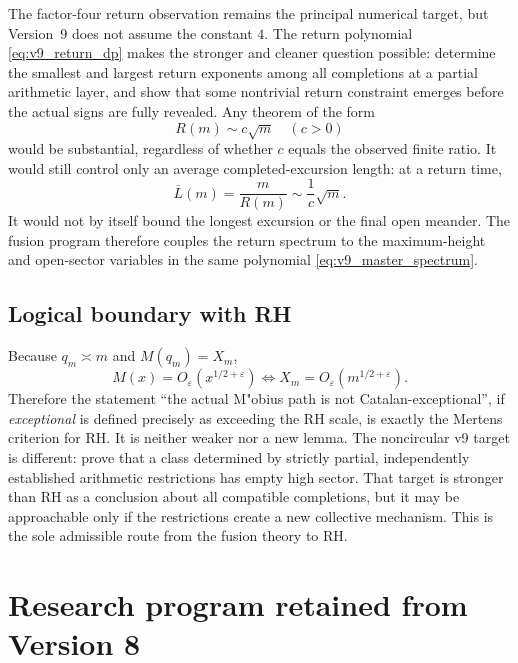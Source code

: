 \documentclass[11pt]{amsart}
\numberwithin{equation}{section}
\theoremstyle{plain}
\theoremstyle{definition}
\theoremstyle{remark}
\newcommand{\eps}{\varepsilon}
\begin{document}
The factor-four return observation remains the principal numerical target,
but Version~9 does not assume the constant $4$.  The return polynomial
\eqref{eq:v9_return_dp} makes the stronger and cleaner question possible:
determine the smallest and largest return exponents among all completions at a
partial arithmetic layer, and show that some nontrivial return constraint
emerges before the actual signs are fully revealed.  Any theorem of the form
\begin{equation}
R(m)\sim c\sqrt m\quad(c>0)
\label{eq:v9_generic_return_law}
\end{equation}
would be substantial, regardless of whether $c$ equals the observed finite
ratio.  It would still control only an average completed-excursion length:
at a return time,
\begin{equation}
\overline L(m)=\frac{m}{R(m)}\sim\frac{1}{c}\sqrt m.
\label{eq:v9_mean_length_generic}
\end{equation}
It would not by itself bound the longest excursion or the final open meander.
The fusion program therefore couples the return spectrum to the maximum-height
and open-sector variables in the same polynomial \eqref{eq:v9_master_spectrum}.

\subsection{Logical boundary with RH}

Because $q_m\asymp m$ and $M(q_m)=X_m$,
\begin{equation}
M(x)=O_\eps(x^{1/2+\eps})
\iff
X_m=O_\eps(m^{1/2+\eps}).
\label{eq:v9_exact_rh_coordinate_change}
\end{equation}
Therefore the statement ``the actual M"obius path is not Catalan-exceptional'',
if \emph{exceptional} is defined precisely as exceeding the RH scale, is
exactly the Mertens criterion for RH.  It is neither weaker nor a new lemma.
The noncircular v9 target is different: prove that a class determined by
strictly partial, independently established arithmetic restrictions has empty
high sector.  That target is stronger than RH as a conclusion about all
compatible completions, but it may be approachable only if the restrictions
create a new collective mechanism.  This is the sole admissible route from the
fusion theory to RH.

\section{Research program retained from Version 8}
\label{sec:research_program}
\end{document}
